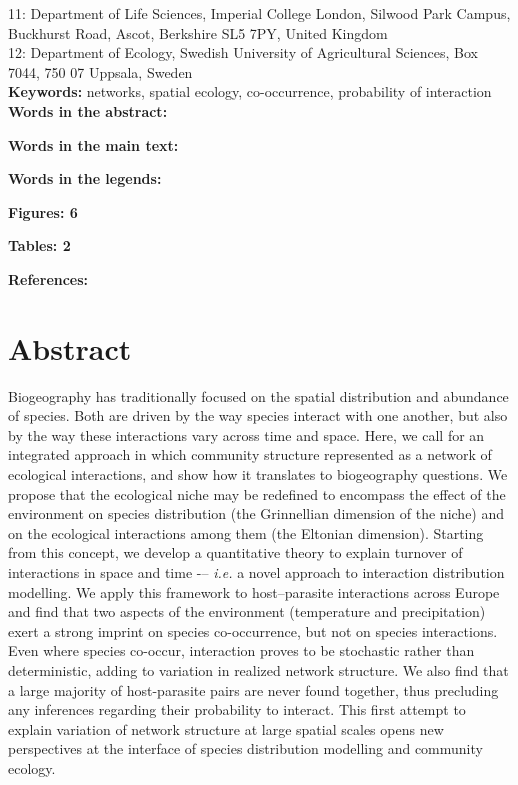 \documentclass[12pt]{article}
\begin{document}
11: Department of Life Sciences, Imperial College London, Silwood Park Campus, 
Buckhurst Road, Ascot, Berkshire SL5 7PY, United Kingdom\\

12: Department of Ecology, Swedish University of Agricultural Sciences, Box 7044, 750 07 Uppsala, Sweden\\

\textbf{Keywords:} networks, spatial ecology, co-occurrence, probability of interaction\\

\textbf{Words in the abstract:}

\textbf{Words in the main text:}

\textbf{Words in the legends:}

\textbf{Figures: 6}

\textbf{Tables: 2}

\textbf{References:}

\newpage
\doublespacing

\section*{Abstract}

Biogeography has traditionally focused on the spatial distribution and
abundance of species. Both are driven by the way species interact with one
another, but also by the way these interactions vary across time and space.
Here, we call for an integrated approach in which community structure
represented as a network of ecological interactions, and show how it
translates to biogeography questions. We propose that the ecological niche may
be redefined to encompass the effect of the environment on species
distribution (the Grinnellian dimension of the niche) and on the ecological
interactions among them (the Eltonian dimension). Starting from this 
concept, we develop a quantitative theory to explain turnover of interactions
in space and time -– \emph{i.e.} a novel approach to interaction distribution
modelling. We apply this framework to host–parasite interactions across Europe
and find that two aspects of the environment (temperature and precipitation)
exert a strong imprint on species co-occurrence, but not on species
interactions. Even where species co-occur, interaction proves to be stochastic
rather than deterministic, adding to variation in realized network structure.
We also find that a large majority of host-parasite pairs are never found
together, thus precluding any inferences regarding their probability to
interact. This first attempt to explain variation of network
structure at large spatial scales opens new perspectives at the interface
of species distribution modelling and community ecology.
\end{document}
